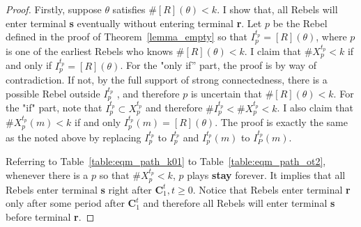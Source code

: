 \documentclass[12pt,letter]{article}
\newcommand{\Kappa}{\mathbf{C}}
\theoremstyle{definition}
\theoremstyle{remark}
\theoremstyle{claim}
\begin{document}
\begin{proof}
Firstly, suppose $\theta$ satisfies $\#[R](\theta)<k$. I show that, all Rebels will enter terminal \textbf{s} eventually without entering terminal \textbf{r}.  Let $p$ be the Rebel defined in the proof of Theorem~\ref{lemma_empty} so that $I^{t_p}_p=[R](\theta)$, where $p$ is one of the earliest Rebels who knows $\#[R](\theta)<k$. I claim that $\#X^{t_p}_p< k$ if and only if $I^{t_p}_p=[R](\theta)$. For the "only if'' part, the proof is by way of contradiction. If not, by the full support of strong connectedness, there is a possible Rebel outside $I^{t_p}_p$ , and therefore $p$ is uncertain that $\#[R](\theta)<k$. For the "if" part, note that $I^{t_p}_p\subset X^{t_p}_p$ and therefore $\#I^{t_p}_p< \#X^{t_p}_p<k$. I also claim that $\#X^{t_p}_p(m)<k$ if and only $I^{t_p}_p(m)=[R](\theta)$. The proof is exactly the same as the noted above by replacing $I^{t_p}_p$ to $I^{t_p}_p$ and $I^{t_p}_p(m)$ to $I^{t_p}_P(m)$.

Referring to Table~\ref{table:eqm_path_k01} to Table~\ref{table:eqm_path_ot2}, whenever there is a $p$ so that $\#X^{t_p}_p<k$, $p$ plays \textbf{stay} forever. It implies that all Rebels enter terminal \textbf{s} right after $\Kappa^t_1, t\geq 0$. Notice that Rebels enter terminal \textbf{r} only after some period after $\Kappa^t_1$ and therefore all Rebels will enter terminal \textbf{s} before terminal \textbf{r}. 


\end{proof}
\end{document}
